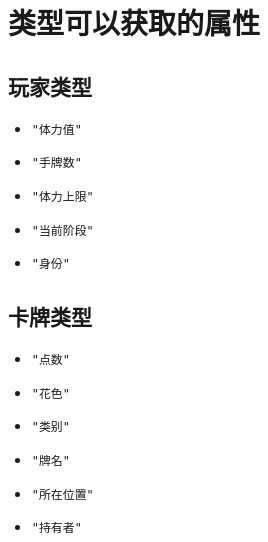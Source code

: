\chapter{类型可以获取的属性}

\section{玩家类型}

\begin{itemize}
 \item \verb|"体力值"|
 \item \verb|"手牌数"|
 \item \verb|"体力上限"|
 \item \verb|"当前阶段"|
 \item \verb|"身份"|
\end{itemize}

\section{卡牌类型}

\begin{itemize}
 \item \verb|"点数"|
 \item \verb|"花色"|
 \item \verb|"类别"|
 \item \verb|"牌名"|
 \item \verb|"所在位置"|
 \item \verb|"持有者"|
\end{itemize}
